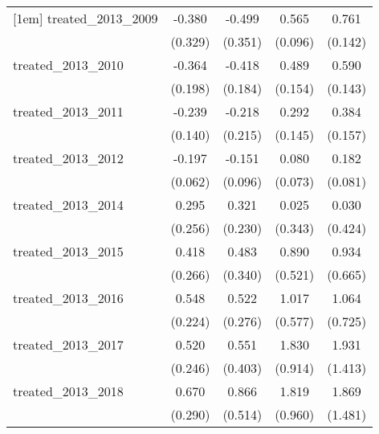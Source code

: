 {\begin{tabular}{l*{4}{c}}
[1em]
treated\_2013\_2009&      -0.380         &      -0.499         &       0.565\sym{***}&       0.761\sym{***}\\
            &     (0.329)         &     (0.351)         &     (0.096)         &     (0.142)         \\
[1em]
treated\_2013\_2010&      -0.364         &      -0.418\sym{*}  &       0.489\sym{**} &       0.590\sym{***}\\
            &     (0.198)         &     (0.184)         &     (0.154)         &     (0.143)         \\
[1em]
treated\_2013\_2011&      -0.239         &      -0.218         &       0.292\sym{*}  &       0.384\sym{*}  \\
            &     (0.140)         &     (0.215)         &     (0.145)         &     (0.157)         \\
[1em]
treated\_2013\_2012&      -0.197\sym{**} &      -0.151         &       0.080         &       0.182\sym{*}  \\
            &     (0.062)         &     (0.096)         &     (0.073)         &     (0.081)         \\
[1em]
treated\_2013\_2014&       0.295         &       0.321         &       0.025         &       0.030         \\
            &     (0.256)         &     (0.230)         &     (0.343)         &     (0.424)         \\
[1em]
treated\_2013\_2015&       0.418         &       0.483         &       0.890         &       0.934         \\
            &     (0.266)         &     (0.340)         &     (0.521)         &     (0.665)         \\
[1em]
treated\_2013\_2016&       0.548\sym{*}  &       0.522         &       1.017         &       1.064         \\
            &     (0.224)         &     (0.276)         &     (0.577)         &     (0.725)         \\
[1em]
treated\_2013\_2017&       0.520\sym{*}  &       0.551         &       1.830\sym{*}  &       1.931         \\
            &     (0.246)         &     (0.403)         &     (0.914)         &     (1.413)         \\
[1em]
treated\_2013\_2018&       0.670\sym{*}  &       0.866         &       1.819         &       1.869         \\
            &     (0.290)         &     (0.514)         &     (0.960)         &     (1.481)         \\

\end{tabular}}
